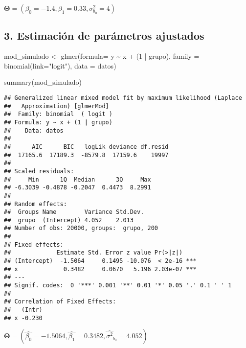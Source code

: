\documentclass[
]{article}
\newenvironment{Shaded}{\begin{snugshade}}{\end{snugshade}}
\newcommand{\AttributeTok}[1]{\textcolor[rgb]{0.77,0.63,0.00}{#1}}
\newcommand{\DecValTok}[1]{\textcolor[rgb]{0.00,0.00,0.81}{#1}}
\newcommand{\FunctionTok}[1]{\textcolor[rgb]{0.00,0.00,0.00}{#1}}
\newcommand{\NormalTok}[1]{#1}
\newcommand{\OtherTok}[1]{\textcolor[rgb]{0.56,0.35,0.01}{#1}}
\newcommand{\SpecialCharTok}[1]{\textcolor[rgb]{0.00,0.00,0.00}{#1}}
\newcommand{\StringTok}[1]{\textcolor[rgb]{0.31,0.60,0.02}{#1}}
\begin{document}
\(\boldsymbol{\Theta}=(\beta_0=-1.4,\beta_1=0.33,\sigma^2_{b_0}=4)\)

\hypertarget{estimaciuxf3n-de-paruxe1metros-ajustados}{%
\subsection{3. Estimación de parámetros
ajustados}\label{estimaciuxf3n-de-paruxe1metros-ajustados}}

\begin{Shaded}
\begin{Highlighting}[]
\NormalTok{mod\_simulado }\OtherTok{\textless{}{-}} \FunctionTok{glmer}\NormalTok{(}\AttributeTok{formula=}\NormalTok{ y }\SpecialCharTok{\textasciitilde{}}\NormalTok{ x }\SpecialCharTok{+}\NormalTok{ (}\DecValTok{1} \SpecialCharTok{|}\NormalTok{ grupo),}
                      \AttributeTok{family =} \FunctionTok{binomial}\NormalTok{(}\AttributeTok{link=}\StringTok{"logit"}\NormalTok{),}
                      \AttributeTok{data =}\NormalTok{ datos)}
\end{Highlighting}
\end{Shaded}

\begin{Shaded}
\begin{Highlighting}[]
\FunctionTok{summary}\NormalTok{(mod\_simulado)}
\end{Highlighting}
\end{Shaded}

\begin{verbatim}
## Generalized linear mixed model fit by maximum likelihood (Laplace
##   Approximation) [glmerMod]
##  Family: binomial  ( logit )
## Formula: y ~ x + (1 | grupo)
##    Data: datos
## 
##      AIC      BIC   logLik deviance df.resid 
##  17165.6  17189.3  -8579.8  17159.6    19997 
## 
## Scaled residuals: 
##     Min      1Q  Median      3Q     Max 
## -6.3039 -0.4878 -0.2047  0.4473  8.2991 
## 
## Random effects:
##  Groups Name        Variance Std.Dev.
##  grupo  (Intercept) 4.052    2.013   
## Number of obs: 20000, groups:  grupo, 200
## 
## Fixed effects:
##             Estimate Std. Error z value Pr(>|z|)    
## (Intercept)  -1.5064     0.1495 -10.076  < 2e-16 ***
## x             0.3482     0.0670   5.196 2.03e-07 ***
## ---
## Signif. codes:  0 '***' 0.001 '**' 0.01 '*' 0.05 '.' 0.1 ' ' 1
## 
## Correlation of Fixed Effects:
##   (Intr)
## x -0.230
\end{verbatim}

\(\boldsymbol{\Theta}=(\hat{\beta_0}=-1.5064,\hat{\beta_1}=0.3482,\hat{\sigma^2}_{b_0}=4.052)\)
\end{document}
